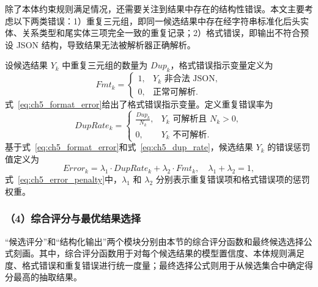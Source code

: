 除了本体约束规则满足情况，还需要关注到结果中存在的结构性错误。本文主要考虑以下两类错误：1）重复三元组，即同一候选结果中存在经字符串标准化后头实体、关系类型和尾实体三项完全一致的重复记录；2）格式错误，即输出不符合预设 JSON 结构，导致结果无法被解析器正确解析。

设候选结果 $Y_k$ 中重复三元组的数量为 $Dup_k$，格式错误指示变量定义为
\begin{equation}
Fmt_k=
\begin{cases}
1, & Y_k \text{ 非合法 JSON}, \\
0, & \text{正常可解析}.
\end{cases}
\label{eq:ch5_format_error}
\end{equation}
式~\eqref{eq:ch5_format_error}给出了格式错误指示变量。定义重复错误率为
\begin{equation}
DupRate_k=
\begin{cases}
\frac{Dup_k}{N_k}, & Y_k \text{ 可解析且 } N_k>0, \\
0, & Y_k \text{ 不可解析}.
\end{cases}
\label{eq:ch5_dup_rate}
\end{equation}
基于式~\eqref{eq:ch5_format_error}和式~\eqref{eq:ch5_dup_rate}，候选结果 $Y_k$ 的错误惩罚值定义为
\begin{equation}
Error_k=\lambda_1 \cdot DupRate_k+\lambda_2 \cdot Fmt_k,\quad \lambda_1+\lambda_2=1,
\label{eq:ch5_error_penalty}
\end{equation}
式~\eqref{eq:ch5_error_penalty}中，$\lambda_1$ 和 $\lambda_2$ 分别表示重复错误项和格式错误项的惩罚权重。

\subsubsection*{（4）综合评分与最优结果选择}

“候选评分”和“结构化输出”两个模块分别由本节的综合评分函数和最终候选选择公式刻画。其中，综合评分函数用于对每个候选结果的模型置信度、本体规则满足度、格式错误和重复错误进行统一度量；最终选择公式则用于从候选集合中确定得分最高的抽取结果。

